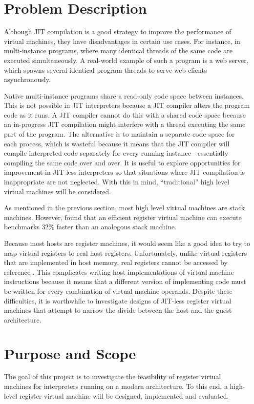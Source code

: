 	\section{Problem Description}
		Although JIT compilation is a good strategy to improve the performance of virtual machines, they have disadvantages in certain use cases. For instance, in multi-instance programs, where many identical threads of the same code are executed simultaneously. A real-world example of such a program is a web server, which spawns several identical program threads to serve web clients asynchronously.
		
		Native multi-instance programs share a read-only code space between instances. This is not possible in JIT interpreters because a JIT compiler alters the program code as it runs. A JIT compiler cannot do this with a shared code space because an in-progress JIT compilation might interfere with a thread executing the same part of the program. The alternative is to maintain a separate code space for each process, which is wasteful because it means that the JIT compiler will compile interpreted code separately for every running instance---essentially compiling the same code over and over. It is useful to explore opportunities for improvement in JIT-less interpreters so that situations where JIT compilation is inappropriate are not neglected. With this in mind, ``traditional'' high level virtual machines will be considered.
		
		As mentioned in the previous section, most high level virtual machines are stack machines. However, \cite{stackregistershowdown} found that an efficient register virtual machine can execute benchmarks 32\% faster than an analogous stack machine. 
		
		Because most hosts are register machines, it would seem like a good idea to try to map virtual registers to real host registers. Unfortunately, unlike virtual registers that are implemented in host memory, real registers cannot be accessed by reference \citep{caseregistervm}. This complicates writing host implementations of virtual machine instructions because it means that a different version of implementing code must be written for every combination of virtual machine operands. Despite these difficulties, it is worthwhile to investigate designs of JIT-less register virtual machines that attempt to narrow the divide between the host and the guest architecture.
	
	\section{Purpose and Scope}
		The goal of this project is to investigate the feasibility of register virtual machines for interpreters running on a modern architecture. To this end, a high-level register virtual machine will be designed, implemented and evaluated.
	
